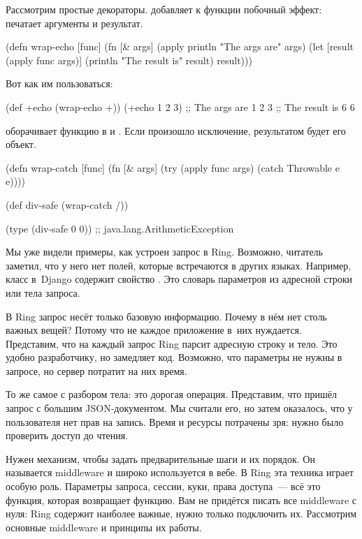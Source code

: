 Рассмотрим простые декораторы.  добавляет к функции побочный
эффект: печатает аргументы и результат.

\begin{clojure}
(defn wrap-echo [func]
  (fn [& args]
    (apply println "The args are" args)
    (let [result (apply func args)]
      (println "The result is" result)
      result)))
\end{clojure}

Вот как им пользоваться:

\begin{clojure}
(def +echo (wrap-echo +))
(+echo 1 2 3)
;; The args are 1 2 3
;; The result is 6
6
\end{clojure}


 оборачивает функцию в  и . Если
произошло исключение, результатом будет его объект.

\begin{clojure}
(defn wrap-catch [func]
  (fn [& args]
    (try
      (apply func args)
      (catch Throwable e
        e))))

(def div-safe (wrap-catch /))

(type (div-safe 0 0))
;; java.lang.ArithmeticException
\end{clojure}


Мы уже видели примеры, как устроен запрос в Ring. Возможно, читатель заметил,
что у него нет полей, которые встречаются в других языках. Например, класс
 в~Django содержит свойство . Это словарь
параметров из адресной строки или тела запроса.

В Ring запрос несёт только базовую информацию. Почему в нём нет столь важных
вещей? Потому что не каждое приложение в~них нуждается. Представим, что на
каждый запрос Ring парсит адресную строку и тело. Это удобно разработчику, но
замедляет код. Возможно, что параметры не нужны в запросе, но сервер потратит на
них время.

То же самое с разбором тела: это дорогая операция. Представим, что пришёл запрос
с большим JSON-документом. Мы считали его, но затем оказалось, что у
пользователя нет прав на запись. Время и ресурсы потрачены зря: нужно было
проверить доступ до чтения.

Нужен механизм, чтобы задать предварительные шаги и их порядок. Он называется
middleware и широко используется в вебе. В Ring эта техника играет особую
роль. Параметры запроса, сессии, куки, права доступа~--- всё это функция,
которая возвращает функцию. Вам не придётся писать все middleware с нуля: Ring
содержит наиболее важные, нужно только подключить их. Рассмотрим основные
middleware и принципы их работы.

